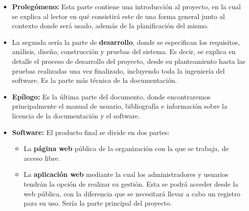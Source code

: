 \begin{itemize} 
\item \textbf{Prolegómeno:} Esta parte contiene una introducción al proyecto, en la cual se explica al lector en qué consistirá este de una forma general junto al contexto donde será usado, además de la planificación del mismo. 
\item La segunda sería la parte de \textbf{desarrollo}, donde se especifican los requisitos, análisis, diseño, construcción y pruebas del sistema. Es decir, se explica en detalle el proceso de desarrollo del proyecto, desde su planteamiento hasta las pruebas realizadas una vez finalizado, incluyendo toda la ingeniería del software. Es la parte más técnica de la documentación.
\item \textbf{Epílogo:} Es la última parte del documento, donde encontraremos principalmente el manual de usuario, bibliografía e información sobre la licencia de la documentación y el software.
 \item \textbf{Software:} El producto final se divide en dos partes: 
 \begin{itemize} 
\item La \textbf{página web} pública de la organización con la que se trabaja, de acceso libre.
\item La \textbf{aplicación web} mediante la cual los administradores y usuarios tendrán la opción de realizar su gestión. Esta se podrá acceder desde la web pública, con la diferencia que se necesitará llevar a cabo un registro para su uso. Sería la parte principal del proyecto.
\end {itemize}
\end {itemize}





